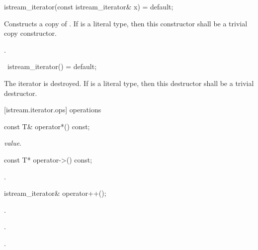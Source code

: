 %
\begin{itemdecl}
istream_iterator(const istream_iterator& x) = default;
\end{itemdecl}

\begin{itemdescr}
\pnum
\effects
Constructs a copy of . If  is a literal type, then this constructor shall be a trivial copy constructor.

\pnum
\postcondition {}.
\end{itemdescr}

%
\begin{itemdecl}
~istream_iterator() = default;
\end{itemdecl}

\begin{itemdescr}
\pnum
\effects
The iterator is destroyed. If  is a literal type, then this destructor shall be a trivial destructor.
\end{itemdescr}

[istream.iterator.ops]{ operations}

%
%
\begin{itemdecl}
const T& operator*() const;
\end{itemdecl}

\begin{itemdescr}
\pnum
\returns
\textit{value}.
\end{itemdescr}

%
%
\begin{itemdecl}
const T* operator->() const;
\end{itemdecl}

\begin{itemdescr}
\pnum
\returns
{}.
\end{itemdescr}

%
%
\begin{itemdecl}
istream_iterator& operator++();
\end{itemdecl}

\begin{itemdescr}
\pnum
\requires {}.

\pnum
\effects
{}.

\pnum
\returns
{}.
\end{itemdescr}

